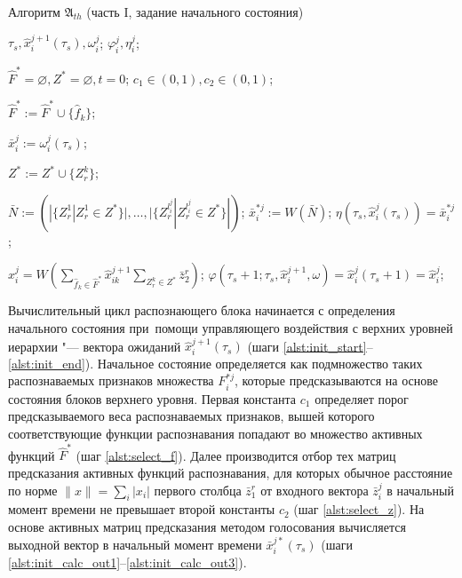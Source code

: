 \begin{algorithm}[H]
	\caption{Алгоритм $\mathfrak{A}_{th}$ (часть I, задание начального состояния)}\label{alg:th_init}
	\begin{algorithmic}[1]
		\Require $\tau_s, \hat{x}_i^{j+1}(\tau_s), \omega_i^j$;
		\Ensure $\varphi_i^j, \eta_i^j$;
		
		\State $\hat{F}^*=\varnothing,Z^*=\varnothing,t=0$;
		\State $c_1\in(0,1), c_2\in(0,1)$;
		
		 \label{alst:init_start}
			 \label{alst:select_f}
				\State $\hat{F}^*:=\hat{F}^*\cup\{\hat{f}_k\}$;
			\EndIf
		\EndFor
		
		\State $\bar x_i^j:=\omega_i^j(\tau_s)$;
		
				 \label{alst:select_z}
					\State $Z^*:=Z^*\cup\{Z_r^k\}$;
				\EndIf
			\EndFor
		\EndFor
		
		\State $\bar N:=(|\{Z_r^1|Z_r^1\in Z^*\}|,\dots,|\{Z_r^{l_i^j}|Z_r^{l_i^j}\in Z^*\}|)$; \label{alst:init_calc_out1}
		\State $\bar{x}_i^{*j}:=W(\bar N)$; \label{init_alst:calc_out2}
		\State $\eta(\tau_s, \hat{x}_i^j(\tau_s))=\bar{x}_i^{*j}$; \label{alst:init_calc_out3}
		
		\State $\hat x_i^j=W(\sum_{\hat f_k\in\hat F^*}\hat x_{ik}^{j+1}\sum_{Z_r^k\in Z^*}\bar z_2^r)$; \label{alst:init_state}
		\State $\varphi(\tau_s+1;\tau_s,\hat{x}_i^{j+1}, \omega)=\hat{x}_i^j(\tau_s+1)=\hat{x}_i^j$;\label{alst:init_end}			
	\end{algorithmic}
\end{algorithm}

Вычислительный цикл распознающего блока начинается с определения начального состояния при~помощи управляющего воздействия с верхних уровней иерархии "--- вектора ожиданий $\hat x_i^{j+1}(\tau_s)$ (шаги \ref{alst:init_start}--\ref{alst:init_end}). Начальное состояние определяется как подмножество таких распознаваемых признаков множества $F_i^{*j}$, которые предсказываются на основе состояния блоков верхнего уровня. Первая константа $c_1$ определяет порог предсказываемого веса распознаваемых признаков, вышей которого соответствующие функции распознавания попадают во множество активных функций $\hat F^*$ (шаг \ref{alst:select_f}). Далее производится отбор тех матриц предсказания активных функций распознавания, для которых обычное расстояние по норме $\|x\|=\sum_i |x_i|$ первого столбца $\bar z_1^r$ от входного вектора $\bar z_i^j$ в начальный момент времени не превышает второй константы $c_2$ (шаг \ref{alst:select_z}). На основе активных матриц предсказания методом голосования вычисляется выходной вектор в начальный момент времени $\bar x_i^{j*}(\tau_s)$ (шаги \ref{alst:init_calc_out1}--\ref{alst:init_calc_out3}).
	
